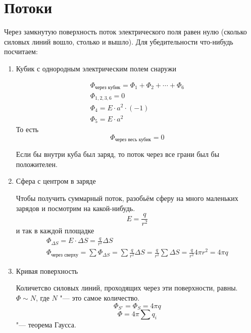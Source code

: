 \section{Потоки}

Через замкнутую поверхность поток электрического поля равен нулю (сколько силовых линий вошло, столько и вышло).
Для убедительности что-нибудь посчитаем:
\begin{enumerate}
\item
	Кубик с однородным электрическим полем снаружи

	\begin{gather*}
		\Phi_{\text{через кубик}} = \Phi_1 + \Phi_2 + \cdots + \Phi_6 \\
		\Phi_{1, 2, 3, 6} = 0 \\
		\Phi_4 = E \cdot a^2 \cdot (-1) \\
		\Phi_5 = E \cdot a^2
	\end{gather*}
	То есть
	\[ \Phi_{\text{через весь кубик}} = 0 \]
	\begin{Rem}
		Если бы внутри куба был заряд, то поток через все грани был бы положителен.
	\end{Rem}

\item
	Сфера с центром в заряде

	Чтобы получить суммарный поток, разобьём сферу на много маленьких зарядов и посмотрим на какой-нибудь.
	\[E = \frac{q}{r^2}\]
	и так в каждой площадке
	\begin{gather*}
		\Phi_{\Delta S} = E \cdot \Delta S = \frac{q}{r^2}\Delta S \\
		\Phi_{\text{через сверху}} = \sum \Phi_{\Delta S} = \sum \frac{q}{r^2}\Delta S = \frac{q}{r^2}\sum\Delta S
			= \frac{q}{r^2}4\pi r^2 = 4 \pi q
	\end{gather*}

\item
	Кривая поверхность

	Количетсво силовых линий, проходящих через эти поверхности, равны. $\Phi \sim N$, где $N$ "--- это самое количество.
	\[\Phi_{S'} = \Phi_S = 4\pi q\]
	\[\Phi = 4\pi\sum q_i\] "--- теорема Гаусса.
\end{enumerate}

